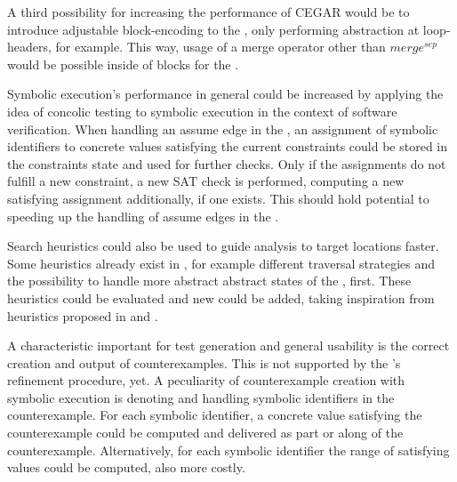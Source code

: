 A third possibility for increasing the performance of CEGAR would be to introduce adjustable block-encoding \cite{Beyer2010}
to the \constraintsCPA, only performing abstraction at loop-headers, for example.
This way, usage of a merge operator other than $merge^{sep}$ would be possible inside of blocks for the \constraintsCPA.

Symbolic execution's performance in general could be increased by applying the idea of concolic testing to symbolic execution in the context of software verification.
When handling an assume edge in the \constraintsCPA, an assignment of symbolic identifiers to concrete values satisfying the current constraints could be stored in the constraints state and used for further checks.
Only if the assignments do not fulfill a new constraint, a new SAT check is performed, computing a new satisfying assignment additionally, if one exists.
This should hold potential to speeding up the handling of assume edges in the \constraintsCPA.

Search heuristics could also be used to guide analysis to target locations faster.
Some heuristics already exist in \cpaChecker, for example different traversal strategies and the possibility to handle more abstract abstract states of the , first.
These heuristics could be evaluated and new could be added, taking inspiration from heuristics proposed in \cite{Burnim2008} and \cite{Cadar2008}.

A characteristic important for test generation and general usability is the correct creation and output of counterexamples.
This is not supported by the \symbolicExecutionCPA's refinement procedure, yet.
A peculiarity of counterexample creation with symbolic execution is denoting and handling symbolic identifiers in the counterexample.
For each symbolic identifier, a concrete value satisfying the counterexample could be computed and delivered as part or along of the counterexample.
Alternatively, for each symbolic identifier the range of satisfying values could be computed, also more costly.
